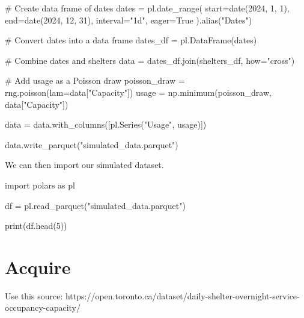 \documentclass[
  letterpaper,
  DIV=11,
  numbers=noendperiod]{scrartcl}
\newenvironment{Shaded}{\begin{snugshade}}{\end{snugshade}}
\newcommand{\BuiltInTok}[1]{\textcolor[rgb]{0.00,0.23,0.31}{#1}}
\newcommand{\CommentTok}[1]{\textcolor[rgb]{0.37,0.37,0.37}{#1}}
\newcommand{\DecValTok}[1]{\textcolor[rgb]{0.68,0.00,0.00}{#1}}
\newcommand{\ImportTok}[1]{\textcolor[rgb]{0.00,0.46,0.62}{#1}}
\newcommand{\NormalTok}[1]{\textcolor[rgb]{0.00,0.23,0.31}{#1}}
\newcommand{\OperatorTok}[1]{\textcolor[rgb]{0.37,0.37,0.37}{#1}}
\newcommand{\StringTok}[1]{\textcolor[rgb]{0.13,0.47,0.30}{#1}}
\newcommand{\VariableTok}[1]{\textcolor[rgb]{0.07,0.07,0.07}{#1}}
\begin{document}
\begin{Shaded}
\begin{Highlighting}[]
\CommentTok{\# Create data frame of dates}
\NormalTok{dates }\OperatorTok{=}\NormalTok{ pl.date\_range(}
\NormalTok{    start}\OperatorTok{=}\NormalTok{date(}\DecValTok{2024}\NormalTok{, }\DecValTok{1}\NormalTok{, }\DecValTok{1}\NormalTok{), end}\OperatorTok{=}\NormalTok{date(}\DecValTok{2024}\NormalTok{, }\DecValTok{12}\NormalTok{, }\DecValTok{31}\NormalTok{), interval}\OperatorTok{=}\StringTok{"1d"}\NormalTok{, eager}\OperatorTok{=}\VariableTok{True}
\NormalTok{).alias(}\StringTok{"Dates"}\NormalTok{)}

\CommentTok{\# Convert dates into a data frame}
\NormalTok{dates\_df }\OperatorTok{=}\NormalTok{ pl.DataFrame(dates)}

\CommentTok{\# Combine dates and shelters}
\NormalTok{data }\OperatorTok{=}\NormalTok{ dates\_df.join(shelters\_df, how}\OperatorTok{=}\StringTok{"cross"}\NormalTok{)}

\CommentTok{\# Add usage as a Poisson draw}
\NormalTok{poisson\_draw }\OperatorTok{=}\NormalTok{ rng.poisson(lam}\OperatorTok{=}\NormalTok{data[}\StringTok{"Capacity"}\NormalTok{])}
\NormalTok{usage }\OperatorTok{=}\NormalTok{ np.minimum(poisson\_draw, data[}\StringTok{"Capacity"}\NormalTok{])}

\NormalTok{data }\OperatorTok{=}\NormalTok{ data.with\_columns([pl.Series(}\StringTok{"Usage"}\NormalTok{, usage)])}

\NormalTok{data.write\_parquet(}\StringTok{"simulated\_data.parquet"}\NormalTok{)}
\end{Highlighting}
\end{Shaded}

We can then import our simulated dataset.

\begin{Shaded}
\begin{Highlighting}[]
\ImportTok{import}\NormalTok{ polars }\ImportTok{as}\NormalTok{ pl}

\NormalTok{df }\OperatorTok{=}\NormalTok{ pl.read\_parquet(}\StringTok{"simulated\_data.parquet"}\NormalTok{)}

\BuiltInTok{print}\NormalTok{(df.head(}\DecValTok{5}\NormalTok{))}
\end{Highlighting}
\end{Shaded}

\section{Acquire}\label{acquire}

Use this source:
https://open.toronto.ca/dataset/daily-shelter-overnight-service-occupancy-capacity/
\end{document}
